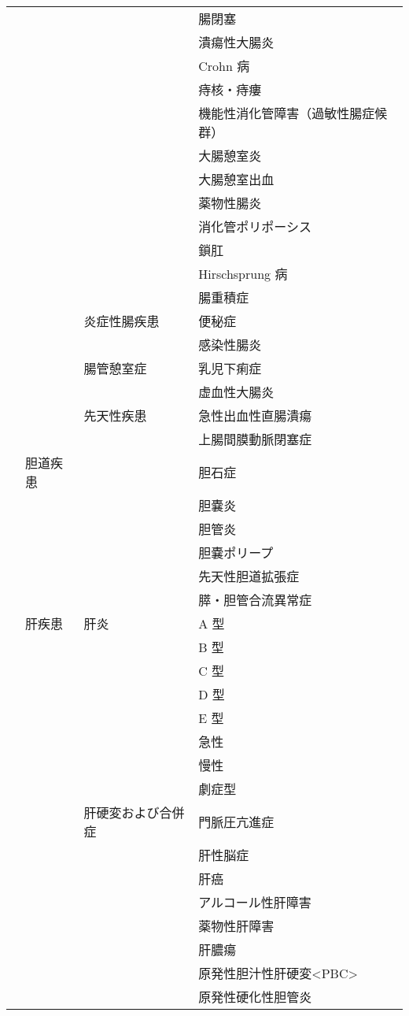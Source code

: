\begin{xltabular}{\linewidth}{XXXX}
 &  &  & 腸閉塞 \\
 &  &  & 潰瘍性大腸炎 \\
 &  &  & Crohn 病 \\
 &  &  & 痔核・痔瘻 \\
 &  &  & 機能性消化管障害（過敏性腸症候群） \\
 &  &  & 大腸憩室炎 \\
 &  &  & 大腸憩室出血 \\
 &  &  & 薬物性腸炎 \\
 &  &  & 消化管ポリポーシス \\
 &  &  & 鎖肛 \\
 &  &  & Hirschsprung 病 \\
 &  &  & 腸重積症 \\
 &  & 炎症性腸疾患 & 便秘症 \\
 &  &  & 感染性腸炎 \\
 &  & 腸管憩室症 & 乳児下痢症 \\
 &  &  & 虚血性大腸炎 \\
 &  & 先天性疾患 & 急性出血性直腸潰瘍 \\
 &  &  & 上腸間膜動脈閉塞症 \\
 & 胆道疾患 &  & 胆石症 \\
 &  &  & 胆嚢炎 \\
 &  &  & 胆管炎 \\
 &  &  & 胆嚢ポリープ \\
 &  &  & 先天性胆道拡張症 \\
 &  &  & 膵・胆管合流異常症 \\
 & 肝疾患 & 肝炎 & A 型 \\
 &  &  & B 型 \\
 &  &  & C 型 \\
 &  &  & D 型 \\
 &  &  & E 型 \\
 &  &  & 急性 \\
 &  &  & 慢性 \\
 &  &  & 劇症型 \\
 &  & 肝硬変および合併症 & 門脈圧亢進症 \\
 &  &  & 肝性脳症 \\
 &  &  & 肝癌 \\
 &  &  & アルコール性肝障害 \\
 &  &  & 薬物性肝障害 \\
 &  &  & 肝膿瘍 \\
 &  &  & 原発性胆汁性肝硬変<PBC> \\
 &  &  & 原発性硬化性胆管炎 \\

\end{xltabular}
